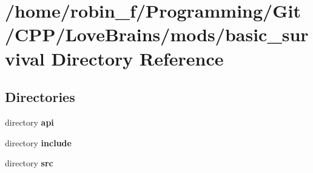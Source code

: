\section{/home/robin\+\_\+f/\+Programming/\+Git/\+C\+P\+P/\+Love\+Brains/mods/basic\+\_\+survival Directory Reference}
\label{dir_236872ee28850108dbd11ed9f1d76c1f}
\subsection*{Directories}
\begin{DoxyCompactItemize}
\item 
directory {\bf api}
\item 
directory {\bf include}
\item 
directory {\bf src}
\end{DoxyCompactItemize}
